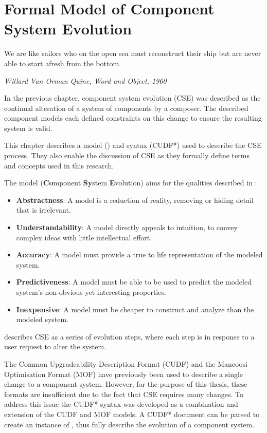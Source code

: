 \chapter{Formal Model of Component System Evolution}
\label{formal}
\epigraph{We are like sailors who on the open sea must reconstruct their ship but are never able to start afresh from the bottom.}
{\textit{Willard Van Orman Quine, Word and Object, 1960}}
In the previous chapter, component system evolution (CSE) was described as the continual alteration of a system of components by a composer.
The described component models each defined constraints on this change to ensure the resulting system is valid.

This chapter describes a model (\modelname) and syntax (CUDF*) used to describe the CSE process. 
They also enable the discussion of CSE as they formally define terms and concepts used in this research.

The model \modelname (\textbf{Co}mponent \textbf{Sy}stem \textbf{E}volution) aims for the qualities described in \citep{Selic2003}:
\begin{itemize}
  \item \textbf{Abstractness}: A model is a reduction of reality, removing or hiding detail that is irrelevant.
  \item \textbf{Understandability}: A model directly appeals to intuition, to convey complex ideas with little intellectual effort.
  \item \textbf{Accuracy}: A model must provide a true to life representation of the modeled system.
  \item \textbf{Predictiveness}: A model must be able to be used to predict the modeled system's non-obvious yet interesting properties.
  \item \textbf{Inexpensive}: A model must be cheaper to construct and analyze than the modeled system.
\end{itemize}
\modelname describes CSE as a series of evolution steps, where each step is in response to a user request to alter the system. 

The Common Upgradeability Description Format (CUDF) \citep{treinen2009common} 
and the Mancoosi Optimisation Format (MOF) \citep{abate2011} have previously been used to describe a single change to a component system.
However, for the purpose of this thesis, these formats are insufficient due to the fact that CSE requires many changes.
To address this issue the CUDF* syntax was developed as a combination and extension of the CUDF and MOF models.
A CUDF* document can be parsed to create an instance of \modelname, thus fully describe the evolution of a component system.


